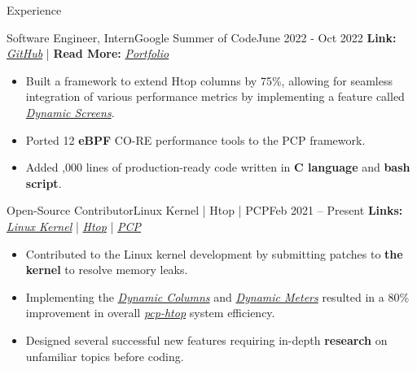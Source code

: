 \documentclass[]{Sohaib-Mohamed}
\begin{document}
\makeheader

\begin{cvsection}{Experience}

   \begin{cvsubsection}{Software Engineer, Intern}{Google Summer of Code}{June 2022 - Oct 2022}
      \textbf{Link:} \href{https://gist.github.com/smalinux/e869b376b5c77cacdcda4cb14f027632}{\textit{GitHub}} | \textbf{Read More:} \href{https://gist.github.com/smalinux/2e9c5537fdac65501a655280352c9c15#google-summer-of-code-2022}{\textit{Portfolio}}
      \begin{itemize}
         \item Built a framework to extend Htop columns by 75\%, allowing for seamless integration of various performance metrics by implementing a feature called \href{https://github.com/htop-dev/htop/pull/1102}{\textit{Dynamic Screens}}.
         \item Ported 12 \textbf{eBPF} CO-RE performance tools to the PCP framework.
         \item Added ,000 lines of production-ready code written in \textbf{C language} and \textbf{bash script}.
      \end{itemize}
   \end{cvsubsection}

   \begin{cvsubsection}{Open-Source Contributor}{Linux Kernel | Htop | PCP}{Feb 2021 -- Present}
      \textbf{Links:} \href{https://git.kernel.org/pub/scm/linux/kernel/git/next/linux-next.git/log/?qt=grep&q=sohaib}{\textit{Linux Kernel}} | \href{https://github.com/htop-dev/htop/commits?author=smalinux}{\textit{Htop}} | \href{https://github.com/performancecopilot/pcp/commits?author=smalinux}{\textit{PCP}}
      \begin{itemize}
         \item Contributed to the Linux kernel development by submitting patches to \textbf{the kernel} to resolve memory leaks.
         \item Implementing the \href{https://github.com/htop-dev/htop/pull/707}{\textit{Dynamic Columns}} and \href{https://github.com/htop-dev/htop/pull/669}{\textit{Dynamic Meters}} resulted in a 80\% improvement in overall \href{https://man.archlinux.org/man/pcp-htop.1.en}{\textit{pcp-htop}} system efficiency.
         \item Designed several successful new features requiring in-depth \textbf{research} on unfamiliar topics before coding.
      \end{itemize}
   \end{cvsubsection}
\end{cvsection}
\end{document}
